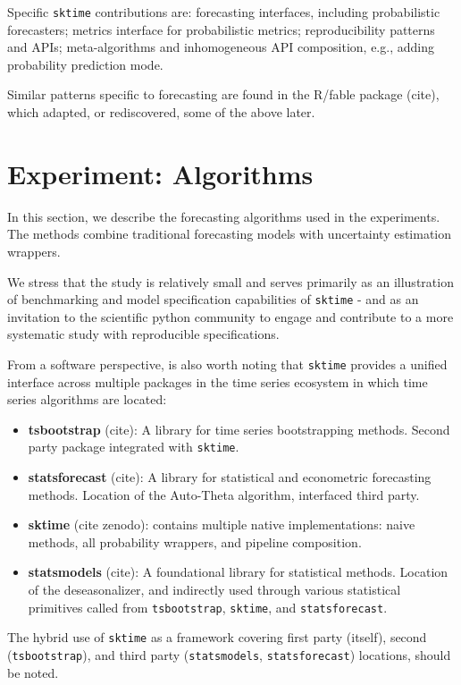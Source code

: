 Specific \texttt{sktime} contributions are: forecasting interfaces, including probabilistic forecasters; metrics interface for probabilistic metrics; reproducibility patterns and APIs; meta-algorithms and inhomogeneous API composition, e.g., adding probability prediction mode.

Similar patterns specific to forecasting are found in the R/fable package (cite), which adapted, or rediscovered, some of the above later.


\section{Experiment: Algorithms} \label{methods}

In this section, we describe the forecasting algorithms used in the experiments. The methods combine traditional forecasting models with uncertainty estimation wrappers.

We stress that the study is relatively small and serves primarily as an illustration of benchmarking and model specification capabilities of \texttt{sktime} - and as an invitation to the scientific python community to engage and contribute to a more systematic study with reproducible specifications.

From a software perspective, is also worth noting that \texttt{sktime} provides a unified interface across multiple packages in the time series ecosystem in which time series algorithms are located:

\begin{itemize}
    \item \textbf{tsbootstrap} (cite): A library for time series bootstrapping methods. Second party package integrated with \texttt{sktime}.
    \item \textbf{statsforecast} (cite): A library for statistical and econometric forecasting methods. Location of the Auto-Theta algorithm, interfaced third party.
    \item \textbf{sktime} (cite zenodo): contains multiple native implementations: naive methods, all probability wrappers, and pipeline composition.
    \item \textbf{statsmodels} (cite): A foundational library for statistical methods. Location of the deseasonalizer, and indirectly used through various statistical primitives called from \texttt{tsbootstrap}, \texttt{sktime}, and \texttt{statsforecast}.
\end{itemize}

The hybrid use of \texttt{sktime} as a framework covering first party (itself), second (\texttt{tsbootstrap}), and third party (\texttt{statsmodels}, \texttt{statsforecast}) locations, should be noted.

